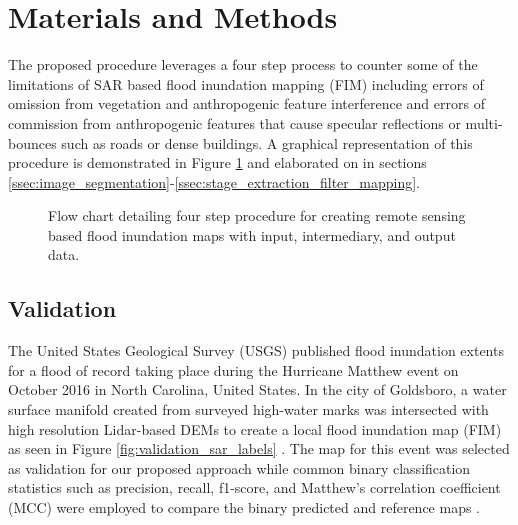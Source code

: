 \documentclass{article}
\begin{document}
\section{Materials and Methods}
\label{sec:materials_and_methods}
%
The proposed procedure leverages a four step process to counter some of the limitations of SAR based flood inundation mapping (FIM) including errors of omission from vegetation and anthropogenic feature interference and errors of commission from anthropogenic features that cause specular reflections or multi-bounces such as roads or dense buildings.
A graphical representation of this procedure is demonstrated in Figure \ref{fig:process_flowchart} and elaborated on in sections \ref{ssec:image_segmentation}-\ref{ssec:stage_extraction_filter_mapping}.
%
\begin{figure}[htb]
    \begin{minipage}[b]{1.0\linewidth}
        \centering
        \centerline{}
    \end{minipage}
    \caption{Flow chart detailing four step procedure for creating remote sensing based flood inundation maps with input, intermediary, and output data.}
    \label{fig:process_flowchart}
\end{figure}
%
\subsection{Validation}
\label{ssec:validation}
%
The United States Geological Survey (USGS) published flood inundation extents for a flood of record taking place during the Hurricane Matthew event on October 2016 in North Carolina, United States. 
In the city of Goldsboro, a water surface manifold created from surveyed high-water marks was intersected with high resolution Lidar-based DEMs to create a local flood inundation map (FIM) as seen in Figure \ref{fig:validation_sar_labels} \cite{musser2017characterization}.
The map for this event was selected as validation for our proposed approach while common binary classification statistics such as precision, recall, f1-score, and Matthew's correlation coefficient (MCC) were employed to compare the binary predicted and reference maps \cite{canbek2017binary,matthews1975comparison}.
%
\end{document}

